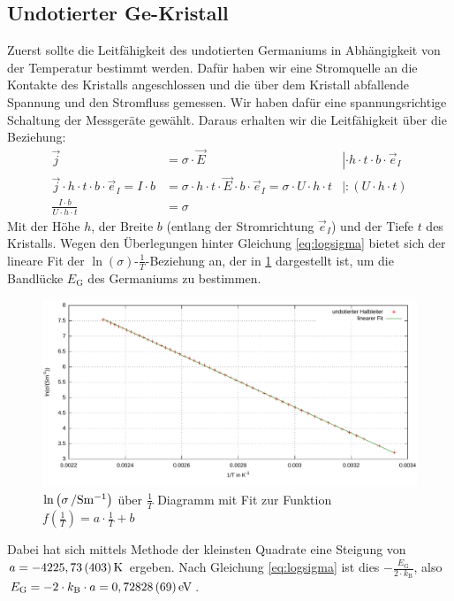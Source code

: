 \documentclass[numbers=noenddot,12pt,a4paper]{scrartcl}
\newcommand{\ix}[1]{_\text{#1}}
\begin{document}
\subsection{Undotierter Ge-Kristall}
Zuerst sollte die Leitfähigkeit des undotierten Germaniums in Abhängigkeit von der Temperatur bestimmt werden. Dafür haben wir eine Stromquelle an die Kontakte des Kristalls angeschlossen und die über dem Kristall abfallende Spannung und den Stromfluss gemessen. Wir haben dafür eine spannungsrichtige Schaltung der Messgeräte gewählt. Daraus erhalten wir die Leitfähigkeit über die Beziehung:
\begin{align}
\vec{j}&=\sigma\cdot\vec{E}&\left|\cdot h\cdot t\cdot b\cdot \vec{e}_I\right.\nonumber\\
\vec{j}\cdot h\cdot t\cdot b\cdot\vec{e}_I=I\cdot b&=\sigma\cdot h\cdot t\cdot\vec{E}\cdot b\cdot \vec{e}_I=\sigma\cdot U\cdot h\cdot t &\left|:(U\cdot h\cdot t)\right.\\
\frac{I\cdot b}{U\cdot h\cdot t}&=\sigma
\end{align}
Mit der Höhe $h$, der Breite $b$ (entlang der Stromrichtung $\vec{e}_I$) und der Tiefe $t$ des Kristalls. Wegen den Überlegungen hinter Gleichung \ref{eq:logsigma} bietet sich der lineare Fit der $\ln\left(\sigma\right)$-$\frac{1}{T}$-Beziehung an, der in \ref{img:undlogsig} dargestellt ist, um die Bandlücke $E\ix{G}$ des Germaniums zu bestimmen.
\begin{figure}[H]
	\includegraphics[width=\textwidth]{messwerte/undotiert.pdf}
	\caption{$\ln\left(\unit[\sigma]{/Sm^{-1}} \right)$ über $\frac{1}{T}$ Diagramm mit Fit zur Funktion $f\left(\frac{1}{T}\right)=a\cdot\frac{1}{T}+b$} \label{img:undlogsig}
\end{figure}
Dabei hat sich mittels Methode der kleinsten Quadrate eine Steigung von $a=\unit[-4225,73\,(403)]{K}$ ergeben. Nach Gleichung \ref{eq:logsigma} ist dies $-\frac{E\ix{G}}{2\cdot k\ix{B}}$, also $E\ix{G}=-2\cdot k\ix{B}\cdot a=\unit[0,72828\,(69)]{eV}$.
\end{document}
